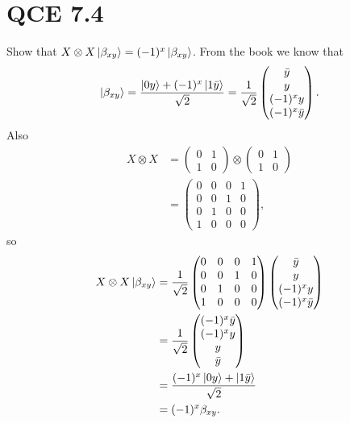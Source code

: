 \documentclass[10pt]{article}
\begin{document}
\section*{QCE 7.4}
Show that $X \otimes X \ket{\beta_{xy}} = (-1)^x \ket{\beta_{xy}}$. From the book we know that 
\[
\ket{\beta_{xy}} = \frac{\ket{0y} + (-1)^x\ket{1\bar{y}}}{\sqrt{2}} 
= 
\frac{1}{\sqrt{2}}
\begin{pmatrix}
\bar{y} \\
y \\
(-1)^x y \\
(-1)^x \bar{y}
\end{pmatrix}.
\]
Also 
\begin{align*}
X \otimes X &= 
\begin{pmatrix}
0 & 1 \\
1 & 0
\end{pmatrix}
\otimes 
\begin{pmatrix}
0 & 1 \\
1 & 0
\end{pmatrix} \\
&= \begin{pmatrix}
0 & 0 & 0 & 1 \\
0 & 0 & 1 & 0 \\
0 & 1 & 0 & 0 \\
1 & 0 & 0 & 0
\end{pmatrix},
\end{align*}
so
\begin{align*}
X \otimes X \ket{\beta_{xy}} &= 
		\frac{1}{\sqrt{2}}
		\begin{pmatrix}
        0 & 0 & 0 & 1 \\
        0 & 0 & 1 & 0 \\
        0 & 1 & 0 & 0 \\
        1 & 0 & 0 & 0
		\end{pmatrix}
		\begin{pmatrix}
        \bar{y} \\
        y \\
        (-1)^x y \\
        (-1)^x \bar{y} \\
\end{pmatrix} \\
&= \frac{1}{\sqrt{2}}
\begin{pmatrix}
        (-1)^x \bar{y} \\
        (-1)^x y \\
        y \\
        \bar{y} \\
\end{pmatrix} \\
&= \frac{(-1)^x \ket{0y} + \ket{1\bar{y}}}{\sqrt{2}} \\
&= (-1)^x \beta_{xy}.
\end{align*}
\end{document}
